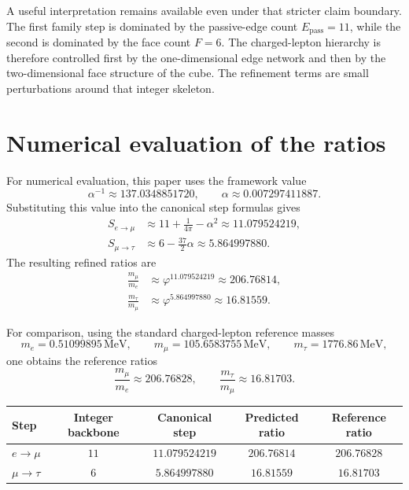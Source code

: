 \documentclass[11pt]{article}
\newcommand{\phig}{\varphi}
\newcommand{\Epass}{E_{\mathrm{pass}}}
\begin{document}
A useful interpretation remains available even under that stricter claim boundary. The first family step is dominated by the passive-edge count \(\Epass=11\), while the second is dominated by the face count \(F=6\). The charged-lepton hierarchy is therefore controlled first by the one-dimensional edge network and then by the two-dimensional face structure of the cube. The refinement terms are small perturbations around that integer skeleton.

\section{Numerical evaluation of the ratios}

For numerical evaluation, this paper uses the framework value
\[
\alpha^{-1}\approx137.0348851720,
\qquad
\alpha\approx0.007297411887.
\]
Substituting this value into the canonical step formulas gives
\begin{align*}
S_{e\to\mu} &\approx 11+\frac{1}{4\pi}-\alpha^2
\approx 11.079524219, \\
S_{\mu\to\tau} &\approx 6-\frac{37}{2}\alpha
\approx 5.864997880.
\end{align*}
The resulting refined ratios are
\begin{align}
\frac{m_\mu}{m_e} &\approx \phig^{11.079524219}
\approx 206.76814,
\label{eq:ratio_emu_num} \\
\frac{m_\tau}{m_\mu} &\approx \phig^{5.864997880}
\approx 16.81559.
\label{eq:ratio_mutau_num}
\end{align}

For comparison, using the standard charged-lepton reference masses
\[
m_e=0.51099895\,\mathrm{MeV},
\qquad
m_\mu=105.6583755\,\mathrm{MeV},
\qquad
m_\tau=1776.86\,\mathrm{MeV},
\]
one obtains the reference ratios
\[
\frac{m_\mu}{m_e}\approx206.76828,
\qquad
\frac{m_\tau}{m_\mu}\approx16.81703.
\]

\begin{center}
\begin{tabular}{|l|c|c|c|c|}
\hline
Step & Integer backbone & Canonical step & Predicted ratio & Reference ratio \\
\hline
\(e\to\mu\) & \(11\) & \(11.079524219\) & \(206.76814\) & \(206.76828\) \\
\hline
\(\mu\to\tau\) & \(6\) & \(5.864997880\) & \(16.81559\) & \(16.81703\) \\
\hline
\end{tabular}
\end{center}
\end{document}
